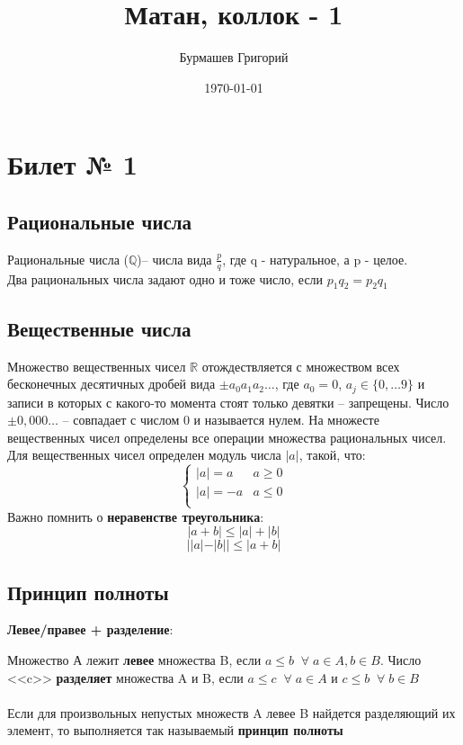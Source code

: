 \documentclass[a4paper,12pt]{article}
\author{Бурмашев Григорий}
\title{Матан, коллок - 1 }
\date{\today}
\begin{document}
\maketitle
\newpage
\section*{Билет № 1}
\subsection*{Рациональные числа}
Рациональные числа ($\mathbb{Q}$)-- числа вида $ \frac{p}{q} $, где q - натуральное,  а p - целое. 
\\
Два рациональных числа задают одно и тоже число, если $p_1q_2 = p_2q_1 $
\subsection*{Вещественные числа}
Множество вещественных чисел $\mathbb{R}$ отождествляется с множеством всех бесконечных десятичных дробей вида $\pm a_0a_1a_2 \ldots$, где $a_0 = 0$, $a_j \in \{0, \ldots 9\}$ и записи в которых с какого-то момента стоят только девятки -- запрещены. Число $\pm 0,000\ldots$ -- совпадает с числом 0 и называется нулем. На множесте вещественных чисел определены все операции множества рациональных чисел. Для вещественных чисел определен модуль числа $|a|$, такой, что:
\begin{equation*}
\begin{cases}
|a| = a & a \geq 0\\
|a| = -a & a \leq 0 \\
\end{cases}
\end{equation*}
Важно помнить о \textbf{неравенстве треугольника}:
\[
|a + b| \leq |a| + |b|
\]
\[
| |a| - |b| | \leq |a + b |
\]
\subsection*{Принцип полноты}
\textbf{Левее/правее + разделение}:

Множество А лежит \textbf{левее} множества B, если $a \leq b\; \; \forall \; a \in A,  b \in B$.  Число <<c>> \textbf{разделяет} множества A и B, если $ a \leq c \; \; \forall \; a \in A$ и $ c \leq b \; \; \forall \; b \in B$
\\\\
Если для произвольных непустых множеств A левее B найдется разделяющий их элемент, то выполняется так называемый \textbf{принцип полноты}
\end{document}

